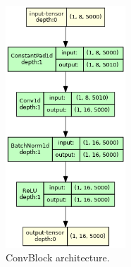 \documentclass[a4paper,10pt]{article}
\begin{document}
\vspace{4cm}
\begin{figure}[H]
	\centering
	\includegraphics[width=0.4\textwidth]{ConvBlock.gv.png}
	\caption{ConvBlock architecture.}%
	\label{fig:convblock_architecture}
\end{figure}
\end{document}
